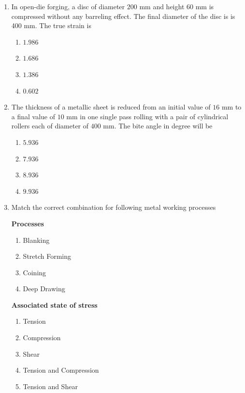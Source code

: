 \documentclass[journal]{IEEEtran}
\begin{document}
\begin{enumerate}[start = 52]
    \item In open-die forging, a disc of diameter $200$ mm and height $60$ mm is compressed without any barreling effect. The final diameter of the disc is is 400 mm. The true strain is 
    \begin{multicols}{4}
        \begin{enumerate}
            \item $1.986$
            \item $1.686$
            \item $1.386$
            \item $0.602$
        \end{enumerate}
    \end{multicols}

    \item The thickness of a metallic sheet is reduced from an initial value of $16$ mm to a final value of $10$ mm in one single pass rolling with a pair of cylindrical rollers each of diameter of $400$ mm. The bite angle in degree will be
    \begin{multicols}{4}
        \begin{enumerate}
            \item $5.936$
            \item $7.936$
            \item $8.936$
            \item $9.936$
        \end{enumerate}
    \end{multicols}

    \item Match the correct combination for following metal working processes
    \begin{multicols}{2}
			\textbf{Processes}
			\begin{enumerate}[label=(\Alph*)]
                
				\item Blanking
				\item Stretch Forming
                    \item Coining
                    \item Deep Drawing
			\end{enumerate}
			\columnbreak
			\textbf{Associated state of stress}
			\begin{enumerate}[label=(\arabic*)]
				\item Tension
				\item Compression
				\item Shear
                    \item Tension and Compression
                    \item Tension and Shear
			\end{enumerate}
		\end{multicols}


\end{enumerate}
\end{document}
